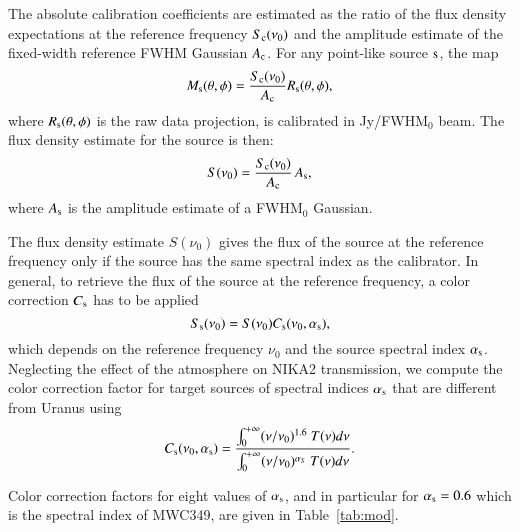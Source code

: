 The absolute calibration coefficients are estimated as the ratio of
the flux density expectations at the reference frequency
$S_{\rm{c}}(\nu_0)$ and the amplitude estimate of the fixed-width reference
FWHM Gaussian $A_{\rm{c}}$. For any point-like source $\rm{s}$, the map
\begin{equation}
  M_{\rm{s}}(\theta, \phi) = \frac{S_{\rm{c}} (\nu_{0})}{A_{\rm{c}}}
  R_{\rm{s}}(\theta,\phi),
\end{equation}
where $R_{\rm{s}}(\theta,\phi)$ is the raw data projection, is calibrated in Jy/FWHM$_{0}$
beam. The flux density estimate for the source is then:
\begin{equation}
S(\nu_{0})  = \frac{S_{\rm{c}}(\nu_{0})}{A_{\rm{c}}} \, A_{\rm{s}},
\label{eq:pointsourcephot}
\end{equation}
where $A_{\rm{s}}$ is the amplitude estimate of a FWHM$_0$ Gaussian.


The flux density estimate $S(\nu_{0})$ gives the
flux of the source at the reference frequency only if the source has
the same spectral index as the calibrator. In general, to retrieve the
flux of the source at the reference frequency, a color correction
$C_{\rm{s}}$ has to be applied
\begin{equation}
S_{\rm{s}}(\nu_{0}) = S(\nu_{0})  C_{\rm{s}}(\nu_{0}, \alpha_{\rm{s}}),
\end{equation}
which depends on the reference frequency $\nu_{0}$ and the source
spectral index $\alpha_{\rm{s}}$.
Neglecting the effect of the atmosphere on NIKA2 transmission, we compute the color correction
factor for target sources of spectral indices $\alpha_{\rm{s}}$ that are
different from Uranus using
\begin{equation}
  C_{\rm{s}}(\nu_{0}, \alpha_{\rm{s}}) = \frac{\int_{0}^{+\infty} (\nu/\nu_0)^{1.6} ~T({\nu}) d\nu}{ \int_{0}^{+\infty} (\nu
    /\nu_0)^{\alpha_S} ~ T({\nu}) d\nu}.
\end{equation}

Color correction factors for eight values of $\alpha_{\rm{s}}$, and in particular
for $\alpha_{\rm{s}}= 0.6$ which is the spectral index of MWC349, are
given in Table~\ref{tab:mod}. 

